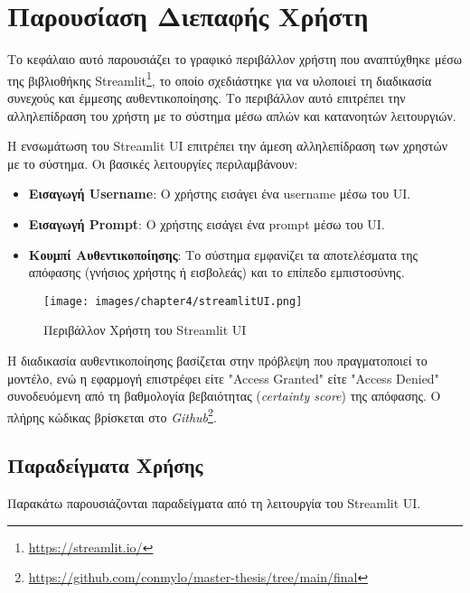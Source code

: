\section{Παρουσίαση Διεπαφής Χρήστη}
\label{sec:implementations_streamlit}

Το κεφάλαιο αυτό παρουσιάζει το γραφικό περιβάλλον χρήστη που αναπτύχθηκε μέσω της βιβλιοθήκης Streamlit\footnote{\url{https://streamlit.io/}}, το οποίο σχεδιάστηκε για να υλοποιεί τη διαδικασία συνεχούς και έμμεσης αυθεντικοποίησης. Το περιβάλλον αυτό επιτρέπει την αλληλεπίδραση του χρήστη με το σύστημα μέσω απλών και κατανοητών λειτουργιών.

Η ενσωμάτωση του Streamlit UI επιτρέπει την άμεση αλληλεπίδραση των χρηστών με το σύστημα. Οι βασικές λειτουργίες περιλαμβάνουν:
\begin{itemize}
    \item \textbf{Εισαγωγή Username}: Ο χρήστης εισάγει ένα username μέσω του UI.
    \item \textbf{Εισαγωγή Prompt}: Ο χρήστης εισάγει ένα prompt μέσω του UI.
    \item \textbf{Κουμπί Αυθεντικοποίησης}: Το σύστημα εμφανίζει τα αποτελέσματα της απόφασης (γνήσιος χρήστης ή εισβολεάς) και το επίπεδο εμπιστοσύνης.
\end{itemize}

\begin{figure}[H]
    \centering
    \texttt{[image: images/chapter4/streamlitUI.png]}
    \caption{Περιβάλλον Χρήστη του Streamlit UI}
    \label{fig:streamlit_ui}
\end{figure}

Η διαδικασία αυθεντικοποίησης βασίζεται στην πρόβλεψη που πραγματοποιεί το μοντέλο, ενώ η εφαρμογή επιστρέφει είτε "Access Granted" είτε "Access Denied" συνοδευόμενη από τη βαθμολογία βεβαιότητας (\textit{certainty score}) της απόφασης. Ο πλήρης κώδικας βρίσκεται στο \emph{Github}\footnote{\href{https://github.com/conmylo/master-thesis/tree/main/final}{https://github.com/conmylo/master-thesis/tree/main/final}}.

\subsection{Παραδείγματα Χρήσης}
Παρακάτω παρουσιάζονται παραδείγματα από τη λειτουργία του Streamlit UI.

